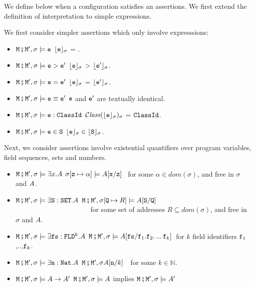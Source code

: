 \begin{definition} We define below when a configuration satisfies an assertions. We first extend the definition of interpretation
to simple expressions.
\label{def:valid:assertion}

We first consider simpler assertions which only involve expresssions:

\begin{itemize}
\item
$\M\mkpair \M', \sigma \models\SE$ \IFF  $\interp{\SE}{\sigma}$ = .
\item
$\M\mkpair \M', \sigma \models\SE>\SEPrime$ \IFF $\interp{\SE}{\sigma}$ > $\interp{\SEPrime}{\sigma}$.
\item
$\M\mkpair \M', \sigma \models\SE=\SEPrime$ \IFF $\interp{\SE}{\sigma}$ = $\interp{\SEPrime}{\sigma}$.
\item
$\M\mkpair \M', \sigma \models\SE\equiv\SEPrime$ \IFF $\SE$ and $\SEPrime$ are textually identical.
\item
$\M\mkpair \M', \sigma \models \SE:\prg{ClassId}$ \IFF $\ClassOf {\interp{\SE}{\sigma}} {\sigma}$ = $\prg{ClassId}$.
\item
$\M\mkpair \M', \sigma \models \SE\in \prg{S}$ \IFF $\interp{\SE}{\sigma}\in \interp{\prg{S}}{\sigma}$.
\end{itemize}

Next, we consider assertions involve existential quantifiers over program variables, field sequences, sets and numbers.

\begin{itemize}
\item
$\M\mkpair \M', \sigma \models \exists x.\A$ \IFF  
$\sigma[\prg{z}\mapsto \alpha] \models  \A[\prg{x}/\prg{z}]$ \ for some  $\alpha\in dom(\sigma)$, and    free in $\sigma$ and $\A$.\item
$\M\mkpair \M', \sigma \models \exists \prg{S}:\prg{SET}.\A$ \IFF  $\M\mkpair \M', \sigma[\prg{Q}\mapsto R] \models  \A[\prg{S}/\prg{Q}]$ \\
$\strut ~ \hspace{1.4in} $ for some set of addresses $R\subseteq dom(\sigma)$, and    free in $\sigma$ and $\A$.
 
\item
$\M\mkpair \M', \sigma \models  \exists \prg{fs}:\prg{FLD}^k.\A$ \IFF  
$\M\mkpair \M', \sigma \models  \A[\prg{fs}/\prg{f}_1.\f_2.\,...\,\prg{f}_k]$\  for  $k$ field identifiers $\prg{f}_1$,..,$\prg{f}_k$.
\item
$\M\mkpair \M', \sigma \models  \exists \prg{n}:\prg{Nat}.\A$ \IFF  $\M\mkpair \M', \sigma \A[\prg{n}/k]$\ \ for some $k\in\mathbb{N}$.
\item
$\M\mkpair \M', \sigma \models \A \rightarrow \A' $ \IFF  $\M\mkpair \M', \sigma \models \A $ implies $\M\mkpair \M', \sigma \models \A' $
\end{itemize}


\end{definition}
